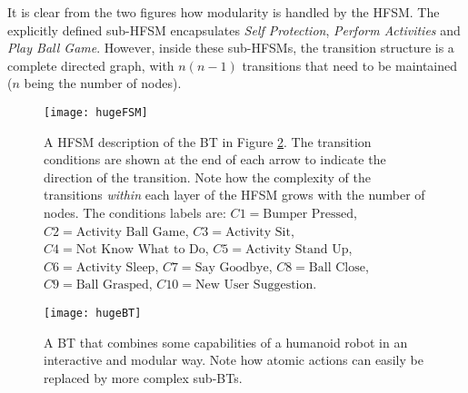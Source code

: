 It is clear from the two figures how modularity is handled by the HFSM. 
The explicitly defined sub-HFSM encapsulates  \emph{Self Protection},  \emph{Perform Activities} and  \emph{Play Ball Game}.
However, inside these sub-HFSMs, the transition structure is a complete directed graph, with $n(n-1)$ transitions that need to be maintained ($n$ being the number of nodes). 


\begin{landscape}
 \begin{figure}
 \centering
  \texttt{[image: hugeFSM]}
  \caption{A HFSM description of the BT in Figure \ref{fig:hugeBT}. The transition conditions are shown at the end of each arrow to indicate the direction of the transition. Note how the complexity of the transitions \emph{within} each layer of the HFSM grows with the number of nodes. The conditions labels are: $C1= \mbox {Bumper Pressed}$, $C2= \mbox {Activity Ball Game}  $, $C3= \mbox {Activity Sit} $, $C4=\mbox {Not Know What to Do} $, $C5= \mbox {Activity Stand Up} $, $C6= \mbox {Activity Sleep} $, $C7=\mbox {Say Goodbye} $, $C8= \mbox {Ball Close} $, $C9= \mbox {Ball Grasped}$, $C10= \mbox {New User Suggestion}$. }
  \label{fig:hugeHFSM}
 \end{figure}
\end{landscape}


\begin{landscape}
 \begin{figure}\centering
  \texttt{[image: hugeBT]}
  \caption{A BT that combines some capabilities  of a humanoid robot in an interactive and modular way. Note how atomic actions can easily be replaced by more complex sub-BTs.}
  \label{fig:hugeBT}
 \end{figure}
\end{landscape}


